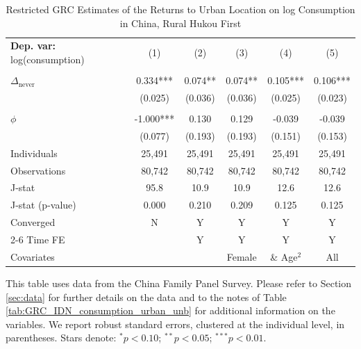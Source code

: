 \begin{table}[htbp] \centering \begin{threeparttable}
 \caption{Restricted GRC Estimates of the Returns to Urban Location on log Consumption in China, Rural Hukou First} 
 \label{tab:GRC_CHN_rural_first_consumption_urban_unb} 
\begin{tabular}{l ccccc} \toprule  \textbf{Dep. var:}  log(consumption) 
                    &\multicolumn{1}{c}{(1)}   &\multicolumn{1}{c}{(2)}   &\multicolumn{1}{c}{(3)}   &\multicolumn{1}{c}{(4)}   &\multicolumn{1}{c}{(5)}   \\
                    &               &               &               &               &               \\
\addlinespace
$\Delta_{\text{never}}$&       0.334***&       0.074** &       0.074** &       0.105***&       0.106***\\
                    &     (0.025)   &     (0.036)   &     (0.036)   &     (0.025)   &     (0.023)   \\
                    &               &               &               &               &               \\
\addlinespace
$\phi$              &      -1.000***&       0.130   &       0.129   &      -0.039   &      -0.039   \\
                    &     (0.077)   &     (0.193)   &     (0.193)   &     (0.151)   &     (0.153)   \\
\addlinespace
Individuals         &      25,491   &      25,491   &      25,491   &      25,491   &      25,491   \\
Observations        &      80,742   &      80,742   &      80,742   &      80,742   &      80,742   \\
J-stat              &        95.8   &        10.9   &        10.9   &        12.6   &        12.6   \\
J-stat (p-value)    &       0.000   &       0.210   &       0.209   &       0.125   &       0.125   \\
Converged           &           N   &           Y   &           Y   &           Y   &           Y   \\
\cmidrule{2-6} Time FE & & Y & Y & Y & Y \\ Covariates & & & Female & \& Age$^2$ & All \\ \bottomrule \end{tabular} \begin{tablenotes}[flushleft] \footnotesize \item{This table uses data from the China Family Panel Survey. Please refer to Section \ref{sec:data} for further details on the data and to the notes of Table \ref{tab:GRC_IDN_consumption_urban_unb} for additional information on the variables. We report robust standard errors, clustered at the individual level, in parentheses. Stars denote: $^{*} p<0.10$; $^{**} p<0.05$; $^{***} p<0.01$.} \end{tablenotes} \end{threeparttable} \end{table}
